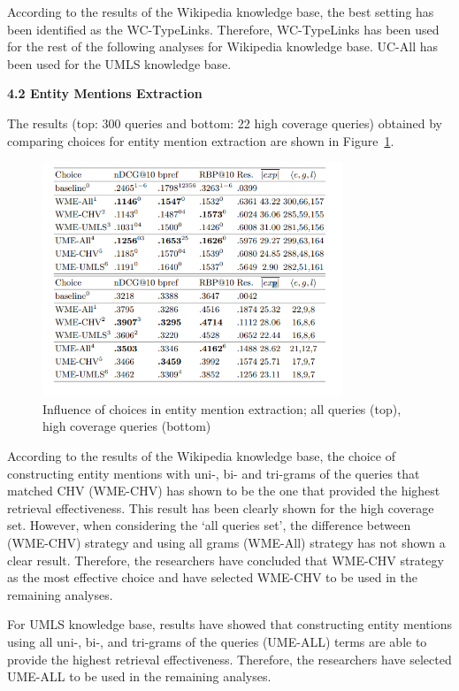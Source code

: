 \documentclass[]{article}
\begin{document}
According to the results of the Wikipedia knowledge base, the best setting has been identified as the WC-TypeLinks. Therefore, WC-TypeLinks has been used for the rest of the following analyses for Wikipedia knowledge base. UC-All has been used for the UMLS knowledge base.

\textbf{4.2 Entity Mentions Extraction} 

The results (top: 300 queries and bottom: 22 high coverage queries) obtained by comparing choices for entity mention extraction are shown in Figure~\ref{fig29}.

\begin{figure}[t!]
	\includegraphics[width=0.8\textwidth]{Capture29.png}
	\caption{Influence of choices in entity mention extraction; all queries (top), high coverage queries (bottom) \label{fig29}}
\end{figure}  

According to the results of the Wikipedia knowledge base, the choice of constructing entity mentions with uni-, bi- and tri-grams of the queries that matched CHV (WME-CHV) has shown to be the one that provided the highest retrieval effectiveness. This result has been clearly shown for the high coverage set. However, when considering the ‘all queries set’, the difference between (WME-CHV) strategy and using all grams (WME-All) strategy has not shown a clear result. Therefore, the researchers have concluded that WME-CHV strategy as the most effective choice and have selected WME-CHV to be used in the remaining analyses. 

For UMLS knowledge base, results have showed that constructing entity mentions using all uni-, bi-, and tri-grams of the queries (UME-ALL) terms are able to provide the highest retrieval effectiveness. Therefore, the researchers have selected UME-ALL to be used in the remaining analyses.  
\end{document}
